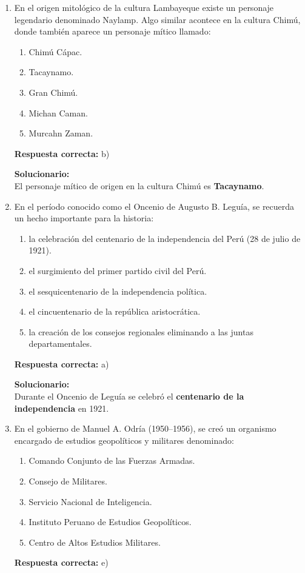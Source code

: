 \begin{enumerate}

	
	\item En el origen mitológico de la cultura Lambayeque existe un personaje legendario denominado Naylamp. Algo similar acontece en la cultura Chimú, donde también aparece un personaje mítico llamado:
	\begin{enumerate}[label=\alph*)]
		\item Chimú Cápac.
		\item Tacaynamo.
		\item Gran Chimú.
		\item Michan Caman.
		\item Murcahn Zaman.
	\end{enumerate}
	\textbf{Respuesta correcta:} b)
	
	\vspace{2mm}
	\textbf{Solucionario:}\\
	El personaje mítico de origen en la cultura Chimú es \textbf{Tacaynamo}.
	

	
	\vspace{6mm}
	
	\item En el período conocido como el Oncenio de Augusto B. Leguía, se recuerda un hecho importante para la historia:
	\begin{enumerate}[label=\alph*)]
		\item la celebración del centenario de la independencia del Perú (28 de julio de 1921).
		\item el surgimiento del primer partido civil del Perú.
		\item el sesquicentenario de la independencia política.
		\item el cincuentenario de la república aristocrática.
		\item la creación de los consejos regionales eliminando a las juntas departamentales.
	\end{enumerate}
	\textbf{Respuesta correcta:} a)
	
	\vspace{2mm}
	\textbf{Solucionario:}\\
	Durante el Oncenio de Leguía se celebró el \textbf{centenario de la independencia} en 1921.
	

	
	\vspace{6mm}
	
	\item En el gobierno de Manuel A. Odría (1950--1956), se creó un organismo encargado de estudios geopolíticos y militares denominado:
	\begin{enumerate}[label=\alph*)]
		\item Comando Conjunto de las Fuerzas Armadas.
		\item Consejo de Militares.
		\item Servicio Nacional de Inteligencia.
		\item Instituto Peruano de Estudios Geopolíticos.
		\item Centro de Altos Estudios Militares.
	\end{enumerate}
	\textbf{Respuesta correcta:} e)
	

\end{enumerate}
